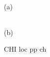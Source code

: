 \begin{figure}[h!]
\begin{minipage}[h]{0.5\linewidth}
 (a) \\
\end{minipage}
\hfill
\begin{minipage}[h]{0.5\linewidth}
 \\(b)
\end{minipage}
\caption{CHI loc pp ch}
\label{fig:CHI_loc_pp_ch}
\end{figure}



